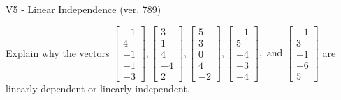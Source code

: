 \begin{exercise}
  \begin{exerciseTitle}V5 - Linear Independence (ver. 789)\end{exerciseTitle}
  \begin{exerciseStatement}
    Explain why the vectors \(\left[\begin{array}{r}
-1 \\
4 \\
-1 \\
-1 \\
-3
\end{array}\right] , \left[\begin{array}{r}
3 \\
1 \\
4 \\
-4 \\
2
\end{array}\right] , \left[\begin{array}{r}
5 \\
3 \\
0 \\
4 \\
-2
\end{array}\right] , \left[\begin{array}{r}
-1 \\
5 \\
-4 \\
-3 \\
-4
\end{array}\right] , \text{ and } \left[\begin{array}{r}
-1 \\
3 \\
-1 \\
-6 \\
5
\end{array}\right]\) are linearly dependent or linearly independent.	



\end{exerciseStatement}
\end{exercise}
